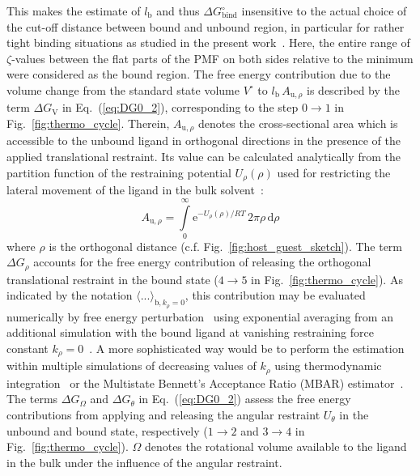 \documentclass[9pt,lessons,pubversion]{livecoms}
\begin{document}
This makes the estimate of $l_\mathrm{b}$ and thus $\Delta G^\circ_\mathrm{bind}$ insensitive to the actual choice of the cut-off distance between bound and unbound region, in particular for rather tight binding situations as studied in the present work~\cite{gilson1997statistical}.
Here, the entire range of $\zeta$-values between the flat parts of the PMF on both sides relative to the minimum were considered as the bound region. 
The free energy contribution due to the volume change from the standard state volume $V^\circ$ to $l_\mathrm{b} \, A_{\mathrm{u},\rho}$ is described by the term $\Delta G_\mathrm{V}$ in Eq.~(\ref{eq:DG0_2}), 
corresponding to the step $0 \rightarrow 1$ in Fig.~\ref{fig:thermo_cycle}.
Therein, $A_{\mathrm{u},\rho}$ denotes the cross-sectional area which is accessible to the unbound ligand in orthogonal directions in the presence of the applied translational restraint.
Its value can be calculated analytically from the partition function of the restraining potential $U_\rho(\rho)$ used for restricting the lateral movement of the ligand in the bulk solvent~\cite{doudou2009standard, markthaler2017molecular}:
\begin{equation}
	A_{\mathrm{u},\rho} = \int\limits_{0}^\infty \mathrm{e}^{- U_\rho(\rho)/RT} \, 2 \pi \rho\, \mathrm{d}\rho
\label{eq:Au}
\end{equation}
where $\rho$ is the orthogonal distance (c.f. Fig.~\ref{fig:host_guest_sketch}). 
The term $\Delta G_\rho$ accounts for the free energy contribution of releasing the orthogonal translational restraint in the bound state ($4 \rightarrow 5$ in Fig.~\ref{fig:thermo_cycle}).
As indicated by the notation $\langle ... \rangle_{\mathrm{b}, k_\rho=0}$, this contribution may be evaluated numerically by free energy perturbation~\cite{zwanzig1954high} using exponential averaging from an additional simulation with the bound ligand at vanishing restraining force constant $k_\rho=0$~\cite{doudou2009standard}.
A more sophisticated way would be to perform the estimation within multiple simulations of decreasing values of $k_\rho$ using thermodynamic integration~\cite{kirkwood1935statistical} or the Multistate Bennett's Acceptance Ratio (MBAR) estimator~\cite{shirts2008statistically}.
%
The terms $\Delta G_\Omega$ and $\Delta G_\theta$ in Eq.~(\ref{eq:DG0_2}) assess the free energy contributions from applying and releasing the angular restraint $U_\theta$ in the unbound and bound state, respectively 
($1 \rightarrow 2$ and $3 \rightarrow 4$ in Fig.~\ref{fig:thermo_cycle}).
$\Omega$ denotes the rotational volume available to the ligand in the bulk under the influence of the angular restraint. 
\end{document}
